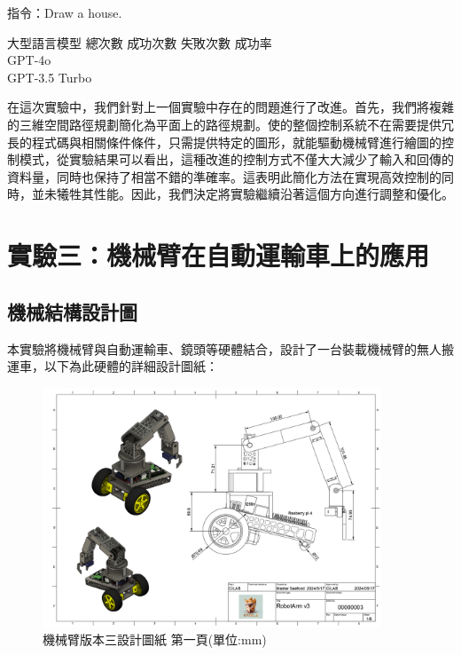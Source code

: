 \documentclass[class=NCU_thesis, crop=false]{standalone}
\begin{document}
指令：Draw a house.
\begin{tabbing}
    大型語言模型 \= 總次數 \= 成功次數 \= 失敗次數 \= 成功率 \\
    GPT-4o   \\
    GPT-3.5 Turbo    \\
\end{tabbing}

在這次實驗中，我們針對上一個實驗中存在的問題進行了改進。首先，我們將複雜的三維空間路徑規劃簡化為平面上的路徑規劃。使的整個控制系統不在需要提供冗長的程式碼與相關條件條件，只需提供特定的圖形，就能驅動機械臂進行繪圖的控制模式，從實驗結果可以看出，這種改進的控制方式不僅大大減少了輸入和回傳的資料量，同時也保持了相當不錯的準確率。這表明此簡化方法在實現高效控制的同時，並未犧牲其性能。因此，我們決定將實驗繼續沿著這個方向進行調整和優化。

\section{實驗三：機械臂在自動運輸車上的應用}
\subsection{機械結構設計圖}
本實驗將機械臂與自動運輸車、鏡頭等硬體結合，設計了一台裝載機械臂的無人搬運車，以下為此硬體的詳細設計圖紙：
\begin{figure}[htbp]
    \centering
    \includegraphics[width=0.9\textwidth]{figures/Armv3 (1).PNG}
    \caption{機械臂版本三設計圖紙 第一頁(單位:mm)}
\end{figure}
\end{document}
